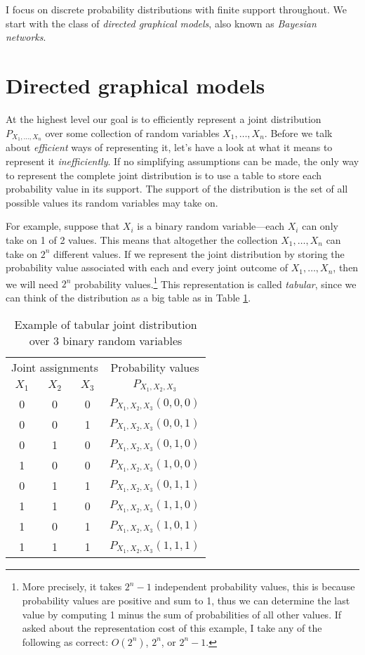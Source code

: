 I focus on discrete probability distributions with finite support throughout.
We start with the class of \emph{directed graphical models}, also known as \emph{Bayesian networks}. 


\section{Directed graphical models}


At the highest level our goal is to efficiently represent a joint distribution $P_{X_1,\ldots,X_n}$ over some collection of random variables $X_1, \ldots, X_n$.
Before we talk about \emph{efficient} ways of representing it, let's have a look at what it means to represent it \emph{inefficiently}.
If no simplifying assumptions can be made, the only way to represent the complete joint distribution is to use a table to store each probability value in its support. 
The support of the distribution is the set of all possible values its random variables may take on. 

For example, suppose that $X_i$ is a binary random variable---each $X_i$ can only take on 1 of 2 values. This means that altogether the collection $X_1, \ldots, X_n$ can take on $2^n$ different values. If we represent the joint distribution by storing the probability value associated with each and every joint outcome of $X_1, \ldots, X_n$, then we will need $2^n$ probability values.\footnote{More precisely, it takes $2^n - 1$ independent probability values, this is because probability values are positive and sum to 1, thus we can determine the last value by computing 1 minus the sum of probabilities of all other values. If asked about the representation cost of this example, I take any of the following as correct: $O(2^n)$, $2^n$, or $2^n -1$.}
This representation is called \emph{tabular}, since we can think of the distribution as a big table as in Table \ref{tab:3binary}.

\begin{table}[h]\centering
\begin{tabular}{c c c | c}
\multicolumn{3}{c|}{Joint assignments} & Probability values \\ 
$X_1$ & $X_2$ & $X_3$ & $P_{X_1, X_2, X_3}$ \\ \hline
0     &  0    &  0  & $P_{X_1, X_2, X_3}(0, 0, 0)$\\
0     &  0    &  1  & $P_{X_1, X_2, X_3}(0, 0, 1)$\\
0     &  1    &  0  & $P_{X_1, X_2, X_3}(0, 1, 0)$\\
1     &  0    &  0  & $P_{X_1, X_2, X_3}(1, 0, 0)$\\
0     &  1    &  1  & $P_{X_1, X_2, X_3}(0, 1, 1)$\\
1     &  1    &  0  & $P_{X_1, X_2, X_3}(1, 1, 0)$\\
1     &  0    &  1  & $P_{X_1, X_2, X_3}(1, 0, 1)$\\
1     &  1    &  1  & $P_{X_1, X_2, X_3}(1, 1, 1)$ \\ 
\end{tabular}
\caption{\label{tab:3binary}Example of tabular joint distribution over 3 binary random variables}
\end{table}

